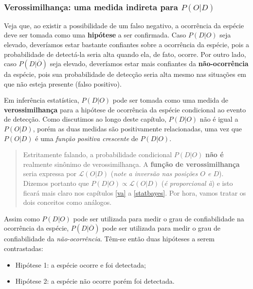\documentclass[
]{book}
\begin{document}
\hypertarget{verossimilhanuxe7a-uma-medida-indireta-para-pod}{%
\subsubsection*{\texorpdfstring{Verossimilhança: uma medida indireta para \(P(O|D)\)}{Verossimilhança: uma medida indireta para P(O\textbar D)}}\label{verossimilhanuxe7a-uma-medida-indireta-para-pod}}

Veja que, ao existir a possibilidade de um falso negativo, a ocorrência da espécie deve ser tomada como uma \textbf{hipótese} a ser confirmada. Caso \(P(D|O)\) seja elevado, deveríamos estar bastante confiantes sobre a ocorrência da espécie, pois a probabilidade de detectá-la seria alta quando ela, de fato, ocorre. Por outro lado, caso \(P(D|\overline{O})\) seja elevado, deveríamos estar mais confiantes da \textbf{não-ocorrência} da espécie, pois sua probabilidade de detecção seria alta mesmo nas situações em que não esteja presente (falso positivo).

Em inferência estatística, \(P(D|O)\) pode ser tomada como uma medida de \textbf{verossimilhança} para a hipótese de ocorrência da espécie condicional ao evento de detecção. Como discutimos ao longo deste capítulo, \(P(D|O)\) não é igual a \(P(O|D)\), porém as duas medidas são positivamente relacionadas, uma vez que \(P(O|D)\) é uma \emph{função positiva crescente} de \(P(D|O)\).

\begin{quote}
Estritamente falando, a probabilidade condicional \(P(D|O)\) \textbf{não é} realmente sinônimo de verossimilhança. A \textbf{função de verossimilhança} seria expressa por \(\mathcal{L}(O|D)\) (\emph{note a inversão nas posições \(O\) e \(D\)}). Dizemos portanto que \(P(D|O) \propto \mathcal{L}(O|D)\) (\emph{é proporcional à}) e isto ficará mais claro nos capítulos \ref{va} a \ref{statbayes}. Por hora, vamos tratar os dois conceitos como análogos.
\end{quote}

Assim como \(P(D|O)\) pode ser utilizada para medir o grau de confiabilidade na ocorrência da espécie, \(P(D|\overline{O})\) pode ser utilizada para medir o grau de confiabilidade da \emph{não-ocorrência}. Têm-se então duas hipóteses a serem contrastadas:

\begin{itemize}
\item
  Hipótese 1: a espécie ocorre e foi detectada;
\item
  Hipótese 2: a espécie não ocorre porém foi detectada.
\end{itemize}
\end{document}
